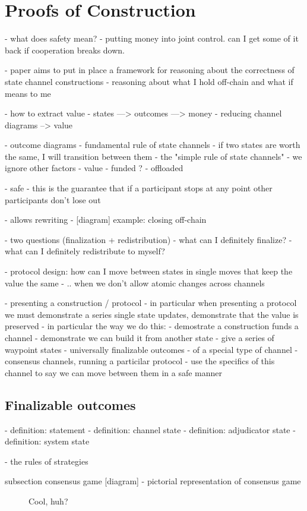 \section{Proofs of Construction}\label{sec:reasoning}


- what does safety mean?
- putting money into joint control. can I get some of it back if cooperation breaks down.








- paper aims to put in place a framework for reasoning about the correctness of state channel constructions
- reasoning about what I hold off-chain and what if means to me

- how to extract value
- states ---> outcomes ---> money
- reducing channel diagrams --> value

- outcome diagrams
- fundamental rule of state channels - if two states are worth the same, I will transition between them
- the "simple rule of state channels" - we ignore other factors
- value
- funded ?
- offloaded

- safe
- this is the guarantee that if a participant stops at any point other participants don't lose out

- allows rewriting
- [diagram] example: closing off-chain

- two questions (finalization + redistribution)
  - what can I definitely finalize?
  - what can I definitely redistribute to myself?

- protocol design: how can I move between states in single moves that keep the value the same
- .. when we don't allow atomic changes across channels

- presenting a construction / protocol
- in particular when presenting a protocol we must demonstrate a series single state updates, demonstrate that the value is preserved
- in particular the way we do this:
  - demostrate a construction funds a channel
  - demonstrate we can build it from another state
    - give a series of waypoint states - universally finalizable outcomes
    - of a special type of channel - consensus channels, running a particilar protocol
    - use the specifics of this channel to say we can move between them in a safe manner


\subsection{Finalizable outcomes}

- definition: statement
- definition: channel state
- definition: adjudicator state
- definition: system state

- the rules of strategies

subsection consensus game
[diagram] - pictorial representation of consensus game

\begin{figure}[h]\centering
  \makebox[\textwidth][c]{}
  \caption{Cool, huh?}
\end{figure}
